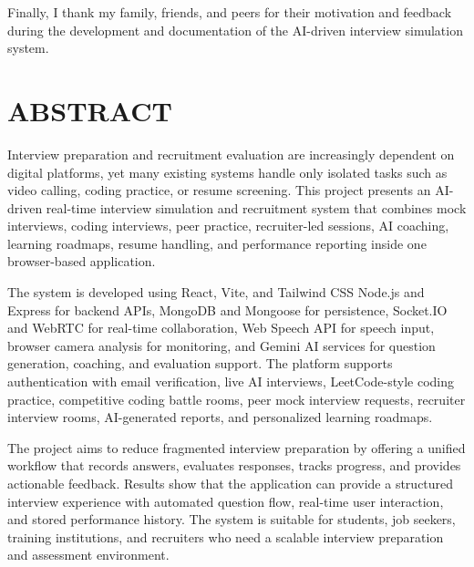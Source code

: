 \documentclass[12pt,a4paper]{report}
\begin{document}
Finally, I thank my family, friends, and peers for their motivation and feedback during the development and documentation of the AI-driven interview simulation system.

\clearpage
\chapter*{ABSTRACT}
\justifying
Interview preparation and recruitment evaluation are increasingly dependent on digital platforms, yet many existing systems handle only isolated tasks such as video calling, coding practice, or resume screening. This project presents an AI-driven real-time interview simulation and recruitment system that combines mock interviews, coding interviews, peer practice, recruiter-led sessions, AI coaching, learning roadmaps, resume handling, and performance reporting inside one browser-based application.

The system is developed using React, Vite, and Tailwind CSS Node.js and Express for backend APIs, MongoDB and Mongoose for persistence, Socket.IO and WebRTC for real-time collaboration, Web Speech API for speech input, browser camera analysis for monitoring, and Gemini AI services for question generation, coaching, and evaluation support. The platform supports authentication with email verification, live AI interviews, LeetCode-style coding practice, competitive coding battle rooms, peer mock interview requests, recruiter interview rooms, AI-generated reports, and personalized learning roadmaps.

The project aims to reduce fragmented interview preparation by offering a unified workflow that records answers, evaluates responses, tracks progress, and provides actionable feedback. Results show that the application can provide a structured interview experience with automated question flow, real-time user interaction, and stored performance history. The system is suitable for students, job seekers, training institutions, and recruiters who need a scalable interview preparation and assessment environment.

\clearpage
\end{document}
